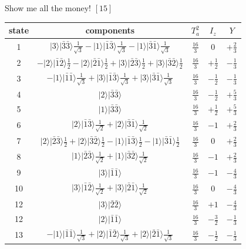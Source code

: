 \documentclass{beamer}
\begin{document}
\begin{frame}{Show me all the money!}
\footnotesize
\center
$[15]$\\
\tiny
\begin{tabular}{c|c|c|c|c}
state&components& $T_a^2$ & $I_z$ & $Y$\\
\hline\hline
1& $|3\rangle|\bar{3}\bar{3}\rangle\frac{1}{\sqrt{3}}-|1\rangle|\bar{1}\bar{3}\rangle\frac{1}{\sqrt{3}}-|1\rangle|\bar{3}\bar{1}\rangle\frac{1}{\sqrt{3}}$ &$\frac{16}{3}$ &$0$ & $+\frac{2}{3}$\\
\hline
2& $-|2\rangle|\bar{1}\bar{2}\rangle\frac{1}{2}-|2\rangle|\bar{2}\bar{1}\rangle\frac{1}{2}+|3\rangle|\bar{2}\bar{3}\rangle\frac{1}{2}+|3\rangle|\bar{3}\bar{2}\rangle\frac{1}{2}$ &$\frac{16}{3}$ &$+\frac{1}{2}$ & $-\frac{1}{3}$\\
3& $-|1\rangle|\bar{1}\bar{1}\rangle\frac{1}{\sqrt{3}}+|3\rangle|\bar{1}\bar{3}\rangle\frac{1}{\sqrt{3}}+|3\rangle|\bar{3}\bar{1}\rangle\frac{1}{\sqrt{3}}$ &$\frac{16}{3}$ &$-\frac{1}{2}$ & $-\frac{1}{3}$\\
\hline
4& $|2\rangle|\bar{3}\bar{3}\rangle$ &$\frac{16}{3}$ &$-\frac{1}{2}$ & $+\frac{5}{3}$\\
5& $|1\rangle|\bar{3}\bar{3}\rangle$ &$\frac{16}{3}$ &$+\frac{1}{2}$ & $+\frac{5}{3}$\\
\hline
6& $|2\rangle|\bar{1}\bar{3}\rangle\frac{1}{\sqrt{2}}+|2\rangle|\bar{3}\bar{1}\rangle\frac{1}{\sqrt{2}}$ &$\frac{16}{3}$ & $-1$ & $+\frac{2}{3}$\\
7& $|2\rangle|\bar{2}\bar{3}\rangle\frac{1}{2}+|2\rangle|\bar{3}\bar{2}\rangle\frac{1}{2}-|1\rangle|\bar{1}\bar{3}\rangle\frac{1}{2}-|1\rangle|\bar{3}\bar{1}\rangle\frac{1}{2}$ &$\frac{16}{3}$ & $0$ & $+\frac{2}{3}$\\
8&$|1\rangle|\bar{2}\bar{3}\rangle\frac{1}{\sqrt{2}}+|1\rangle|\bar{3}\bar{2}\rangle\frac{1}{\sqrt{2}}$ &$\frac{16}{3}$ & $-1$ & $+\frac{2}{3}$\\
\hline
9& $|3\rangle|\bar{1}\bar{1}\rangle$ &$\frac{16}{3}$ &$-1$ & $-\frac{4}{3}$\\
10& $|3\rangle|\bar{1}\bar{2}\rangle\frac{1}{\sqrt{2}}+|3\rangle|\bar{2}\bar{1}\rangle\frac{1}{\sqrt{2}}$ &$\frac{16}{3}$ &$0$ & $-\frac{4}{3}$\\
12& $|3\rangle|\bar{2}\bar{2}\rangle$ &$\frac{16}{3}$ &$+1$ & $-\frac{4}{3}$\\
\hline
12& $|2\rangle|\bar{1}\bar{1}\rangle$ &$\frac{16}{3}$ &$-\frac{3}{2}$ & $-\frac{1}{3}$\\
13& $-|1\rangle|\bar{1}\bar{1}\rangle\frac{1}{\sqrt{3}}+|2\rangle|\bar{1}\bar{2}\rangle\frac{1}{\sqrt{3}}+|2\rangle|\bar{2}\bar{1}\rangle\frac{1}{\sqrt{3}}$ &$\frac{16}{3}$ &$-\frac{1}{2}$ & $-\frac{1}{3}$\\

\end{tabular}
\end{frame}
\end{document}
